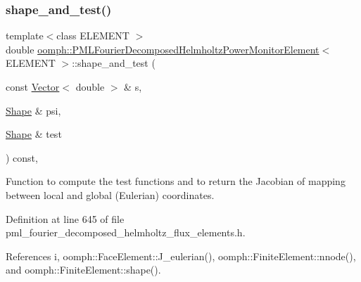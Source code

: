 \subsubsection{\texorpdfstring{shape\+\_\+and\+\_\+test()}{shape\_and\_test()}}
{\footnotesize\ttfamily template$<$class E\+L\+E\+M\+E\+NT $>$ \\
double \hyperlink{classoomph_1_1PMLFourierDecomposedHelmholtzPowerMonitorElement}{oomph\+::\+P\+M\+L\+Fourier\+Decomposed\+Helmholtz\+Power\+Monitor\+Element}$<$ E\+L\+E\+M\+E\+NT $>$\+::shape\+\_\+and\+\_\+test (\begin{DoxyParamCaption}\item[{const \hyperlink{classoomph_1_1Vector}{Vector}$<$ double $>$ \&}]{s,  }\item[{\hyperlink{classoomph_1_1Shape}{Shape} \&}]{psi,  }\item[{\hyperlink{classoomph_1_1Shape}{Shape} \&}]{test }\end{DoxyParamCaption}) const\hspace{0.3cm}{\ttfamily [inline]}, {\ttfamily [protected]}}



Function to compute the test functions and to return the Jacobian of mapping between local and global (Eulerian) coordinates. 



Definition at line 645 of file pml\+\_\+fourier\+\_\+decomposed\+\_\+helmholtz\+\_\+flux\+\_\+elements.\+h.



References i, oomph\+::\+Face\+Element\+::\+J\+\_\+eulerian(), oomph\+::\+Finite\+Element\+::nnode(), and oomph\+::\+Finite\+Element\+::shape().

\mbox{\label{classoomph_1_1PMLFourierDecomposedHelmholtzPowerMonitorElement_ab3b95be5191af9524a4f049d9db413be}} 
